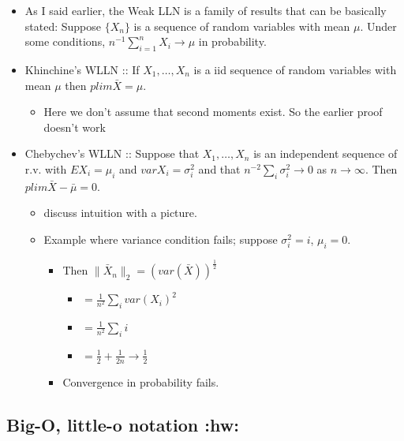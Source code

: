 \begin{itemize}
\item As I said earlier, the Weak LLN is a family of results that can
       be basically stated: Suppose $\{X_n\}$ is a sequence of random
       variables with mean $\mu$.  Under some conditions, $n^{-1}
       \sum_{i=1}^n X_i \to \mu$ in probability.
\item Khinchine's WLLN :: If $X_1,\dots,X_n$ is a iid sequence of
          random variables with mean $\mu$ then $plim \bar X = \mu$.
\begin{itemize}
\item Here we don't assume that second moments exist.  So the earlier
         proof doesn't work
\end{itemize}
\item Chebychev's WLLN :: Suppose that $X_1,\dots,X_n$ is an
          independent sequence of r.v. with $E X_i = \mu_i$ and $var
          X_i = \sigma_i^2$ and that $n^{-2} \sum_i \sigma_i^2 \to 0$
          as $n \to \infty$.  Then $plim \bar X - \bar \mu = 0$.
\begin{itemize}
\item discuss intuition with a picture.
\item Example where variance condition fails; suppose $\sigma_i^2 = i$, $\mu_i = 0$.
\begin{itemize}
\item Then $\|\bar X_n\|_2 = (var(\bar X))^{\frac12}$
\begin{itemize}
\item $= \frac{1}{n^2} \sum_i var(X_i)^2$
\item $= \frac{1}{n^2} \sum_i i$
\item $= \frac12 + \frac{1}{2n} \to \frac{1}{2}$
\end{itemize}
\item Convergence in probability fails.
\end{itemize}
\end{itemize}
\end{itemize}
\subsection{Big-O, little-o notation \textbf{:hw:}}
\label{sec-1-4}

